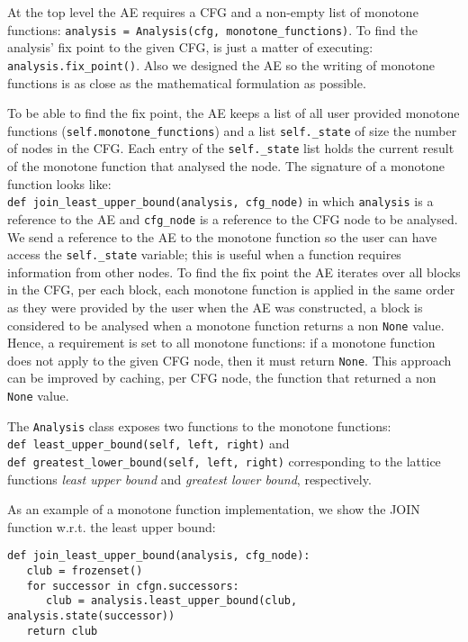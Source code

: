 At the top level the AE requires a CFG and a non-empty list of monotone functions: \lstinline{analysis = Analysis(cfg, monotone_functions)}. To find the analysis' fix point to the given CFG, is just a matter of executing: \lstinline{analysis.fix_point()}. Also we designed the AE so the writing of monotone functions is as close as the mathematical formulation as possible.

To be able to find the fix point, the AE keeps a list of all user provided monotone functions (\lstinline{self.monotone_functions}) and a list \lstinline{self._state} of size the number of nodes in the CFG. Each entry of the \lstinline{self._state} list holds the current result of the monotone function that analysed the node. The signature of a monotone function looks like: \\\lstinline{def join_least_upper_bound(analysis, cfg_node)} in which \lstinline{analysis} is a reference to the AE and \lstinline{cfg_node} is a reference to the CFG node to be analysed. We send a reference to the AE to the monotone function so the user can have access the
\lstinline{self._state} variable; this is useful when a function requires information from other nodes.
To find the fix point the AE iterates over all blocks in the CFG, per each block, each monotone function is applied in the same order as they were provided by the user when the AE was constructed, a block is considered to be analysed when a monotone function returns a non \lstinline{None} value. Hence, a requirement is set to all monotone functions: if a monotone function does not apply to the given CFG node, then it must return \lstinline{None}. This approach can be improved by caching, per CFG node, the function that returned a non \lstinline{None} value.

The \lstinline{Analysis} class exposes two functions to the monotone functions: \\\lstinline{def least_upper_bound(self, left, right)} and \\\lstinline{def greatest_lower_bound(self, left, right)} corresponding to the lattice functions \emph{least upper bound} and \emph{greatest lower bound}, respectively.

As an example of a monotone function implementation, we show the JOIN function w.r.t. the least upper bound: 
\begin{verbatim}
def join_least_upper_bound(analysis, cfg_node):
   club = frozenset()
   for successor in cfgn.successors:
      club = analysis.least_upper_bound(club, analysis.state(successor))
   return club
\end{verbatim}

